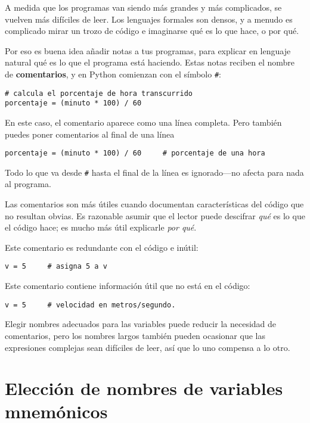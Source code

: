 A medida que los programas van siendo más grandes y más complicados, se vuelven más difíciles
de leer. Los lenguajes formales son densos, y a menudo es complicado
mirar un trozo de código e imaginarse qué es lo que hace, o por qué.

Por eso es buena idea añadir notas a tus programas, para explicar
en lenguaje natural qué es lo que el programa está haciendo. Estas notas reciben el nombre de
{\bf comentarios}, y en Python comienzan con el símbolo \verb"#":


\beforeverb
\begin{verbatim}
# calcula el porcentaje de hora transcurrido
porcentaje = (minuto * 100) / 60
\end{verbatim}
\afterverb
%
En este caso, el comentario aparece como una línea completa. Pero también puedes
poner comentarios al final de una línea

\beforeverb
\begin{verbatim}
porcentaje = (minuto * 100) / 60     # porcentaje de una hora
\end{verbatim}
\afterverb
%
Todo lo que va desde {\tt \#} hasta el final de la línea es ignorado---no
afecta para nada al programa.

Las comentarios son más útiles cuando documentan características del código
que no resultan obvias. Es razonable asumir que el lector puede descifrar
\emph{qué} es lo que el código hace; es mucho más útil explicarle \emph{por qué}.

Este comentario es redundante con el código e inútil:

\beforeverb
\begin{verbatim}
v = 5     # asigna 5 a v
\end{verbatim}
\afterverb
%
Este comentario contiene información útil que no está en el código:

\beforeverb
\begin{verbatim}
v = 5     # velocidad en metros/segundo. 
\end{verbatim}
\afterverb
%
Elegir nombres adecuados para las variables puede reducir la necesidad de comentarios, pero
los nombres largos también pueden ocasionar que las expresiones complejas sean difíciles de leer, así
que lo uno compensa a lo otro.

\section{Elección de nombres de variables mnemónicos}

